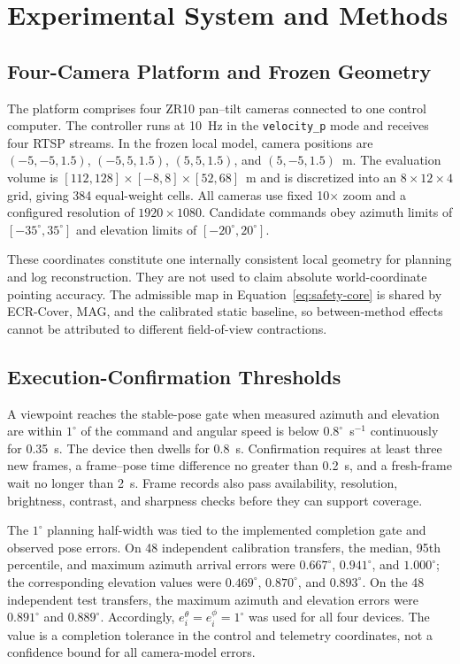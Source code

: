 \section{Experimental System and Methods}\label{sec:experiments}

\subsection{Four-Camera Platform and Frozen Geometry}

The platform comprises four ZR10 pan--tilt cameras connected to one control computer. The controller runs at 10~Hz in the \texttt{velocity\_p} mode and receives four RTSP streams. In the frozen local model, camera positions are $(-5,-5,1.5)$, $(-5,5,1.5)$, $(5,5,1.5)$, and $(5,-5,1.5)$~m. The evaluation volume is $[112,128]\times[-8,8]\times[52,68]$~m and is discretized into an $8\times12\times4$ grid, giving 384 equal-weight cells. All cameras use fixed 10$\times$ zoom and a configured resolution of $1920\times1080$. Candidate commands obey azimuth limits of $[-35^\circ,35^\circ]$ and elevation limits of $[-20^\circ,20^\circ]$.

These coordinates constitute one internally consistent local geometry for planning and log reconstruction. They are not used to claim absolute world-coordinate pointing accuracy. The admissible map in Equation~\eqref{eq:safety-core} is shared by ECR-Cover, MAG, and the calibrated static baseline, so between-method effects cannot be attributed to different field-of-view contractions.

\subsection{Execution-Confirmation Thresholds}

A viewpoint reaches the stable-pose gate when measured azimuth and elevation are within $1^\circ$ of the command and angular speed is below $0.8^\circ$~s$^{-1}$ continuously for 0.35~s. The device then dwells for 0.8~s. Confirmation requires at least three new frames, a frame--pose time difference no greater than 0.2~s, and a fresh-frame wait no longer than 2~s. Frame records also pass availability, resolution, brightness, contrast, and sharpness checks before they can support coverage.

The $1^\circ$ planning half-width was tied to the implemented completion gate and observed pose errors. On 48 independent calibration transfers, the median, 95th percentile, and maximum azimuth arrival errors were $0.667^\circ$, $0.941^\circ$, and $1.000^\circ$; the corresponding elevation values were $0.469^\circ$, $0.870^\circ$, and $0.893^\circ$. On the 48 independent test transfers, the maximum azimuth and elevation errors were $0.891^\circ$ and $0.889^\circ$. Accordingly, $e_i^\theta=e_i^\phi=1^\circ$ was used for all four devices. The value is a completion tolerance in the control and telemetry coordinates, not a confidence bound for all camera-model errors.

